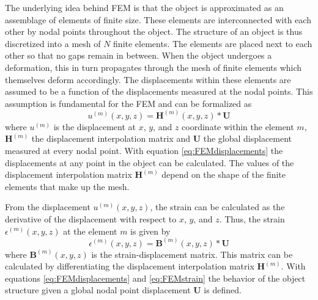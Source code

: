 \documentclass[11pt,a4paper,twoside]{report}
\begin{document}
The underlying idea behind FEM is that the object is approximated as an
assemblage of elements of finite size. These elements are interconnected with
each other by nodal points throughout the object. The structure of an object is
thus discretized into a mesh of $N$ finite elements. The elements are placed
next to each other so that no gaps remain in between. When the object undergoes a
deformation, this in turn propagates through the mesh of finite elements which
themselves deform accordingly. The displacements within these elements are assumed to be a function
of the displacements measured at the nodal points. This assumption is
fundamental for the FEM and can be formalized as
\begin{equation}\label{eq:FEMdisplacements}
u^{(m)}(x,y,z) = \mathbf{H}^{(m)}(x,y,z)*\mathbf{U}
\end{equation}
where $u^{(m)}$ is the displacement at $x$, $y$, and $z$ coordinate within the element $m$, $\mathbf{H}^{(m)}$
the displacement interpolation matrix and $\mathbf{U}$ the global
displacement measured at every nodal point. With equation
\ref{eq:FEMdisplacements} the displacements at any point in the object can be calculated.
The values of the displacement interpolation matrix $\mathbf{H}^{(m)}$ depend on
the shape of the finite elements that make up the mesh.

From the displacement $u^{(m)}(x,y,z)$, the strain can be calculated as the
derivative of the displacement with respect to $x$, $y$, and $z$. Thus, the
strain $\epsilon^{(m)}(x,y,z)$ at the element $m$ is given by  
\begin{equation}\label{eq:FEMstrain}
\epsilon^{(m)}(x,y,z) = \mathbf{B}^{(m)}(x,y,z)*\mathbf{U}
\end{equation}
where $\mathbf{B}^{(m)}(x,y,z)$ is the strain-displacement matrix. This matrix can
be calculated by differentiating the displacement interpolation matrix
$\mathbf{H}^{(m)}$. With equations \ref{eq:FEMdisplacements} and \ref{eq:FEMstrain} the behavior of
the object structure given a global nodal point displacement $\mathbf{U}$ is
defined. 
\end{document}
